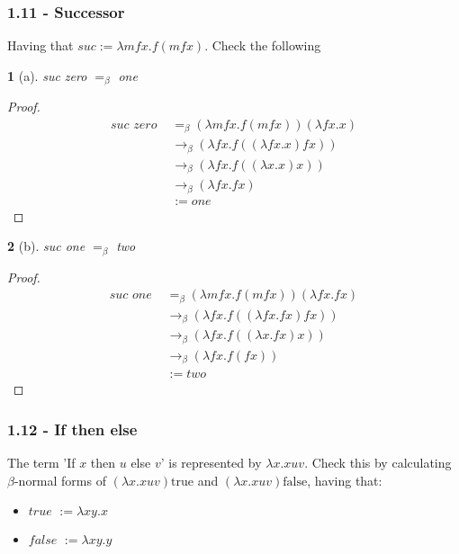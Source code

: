 \documentclass[12pt, a4paper]{article}
\newcommand{\onebeta}{\to_\beta}
\newtheorem*{exercise}{}
\begin{document}
\subsubsection{1.11 - Successor}
Having that $\textit{suc} := \lambda mfx. f(mfx)$. Check the following
\begin{exercise}[a]
    suc zero $=_\beta$ one
\end{exercise}
\begin{proof}
    \begin{subequations}
        \begin{align}
            \textit{suc zero } &=_\beta (\lambda mfx. f(mfx))(\lambda fx.x)\\
            &\onebeta (\lambda fx. f((\lambda fx.x)fx))\\
            &\onebeta (\lambda fx. f((\lambda x.x)x))\\
            &\onebeta (\lambda fx. fx)\\
            &:= one
        \end{align}
    \end{subequations}
\end{proof}

\begin{exercise}[b]
    suc one $=_\beta$ two
\end{exercise}
\begin{proof}
    \begin{subequations}
        \begin{align}
            \textit{suc one } &=_\beta (\lambda mfx. f(mfx))(\lambda fx.fx)\\
            &\onebeta (\lambda fx. f((\lambda fx.fx)fx))\\
            &\onebeta (\lambda fx. f((\lambda x.fx)x))\\
            &\onebeta (\lambda fx. f(fx))\\
            &:= two
        \end{align}
    \end{subequations}
\end{proof}

\subsubsection{1.12 - If then else}
The term 'If $x$ then $u$ else $v$' is represented by $\lambda x. xuv$. Check this by
calculating $\beta$-normal forms of $(\lambda x. xuv)\text{true}$ and $(\lambda x. xuv)\text{false}$, having that:
\begin{itemize}
    \item $\textit{true } := \lambda xy. x$
    \item $\textit{false } := \lambda xy. y$
\end{itemize}
\end{document}
